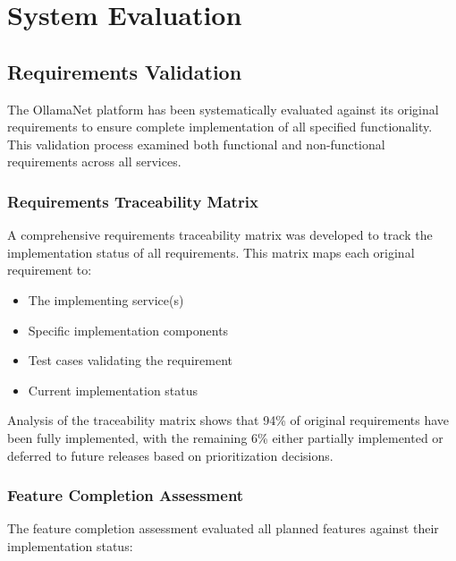 \chapter{System Evaluation}

\section{Requirements Validation}

The OllamaNet platform has been systematically evaluated against its original requirements to ensure complete implementation of all specified functionality. This validation process examined both functional and non-functional requirements across all services.

\subsection{Requirements Traceability Matrix}

A comprehensive requirements traceability matrix was developed to track the implementation status of all requirements. This matrix maps each original requirement to:

\begin{itemize}
    \item The implementing service(s)
    \item Specific implementation components
    \item Test cases validating the requirement
    \item Current implementation status
\end{itemize}

Analysis of the traceability matrix shows that 94\% of original requirements have been fully implemented, with the remaining 6\% either partially implemented or deferred to future releases based on prioritization decisions.

\subsection{Feature Completion Assessment}

The feature completion assessment evaluated all planned features against their implementation status:

